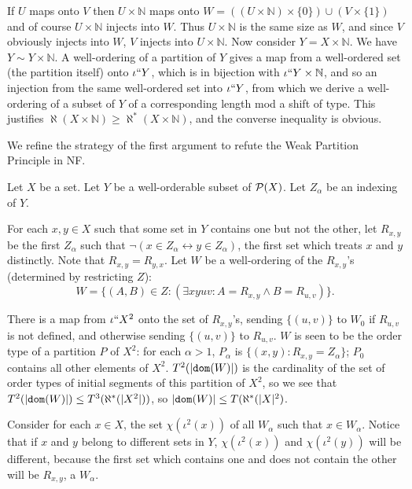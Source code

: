 \documentclass[12pt]{article}
\begin{document}
If $U$ maps onto $V$ then $U \times \mathbb N$ maps onto $W=((U \times \mathbb N) \times \{0\}) \cup (V \times \{1\})$ and of course $U \times \mathbb N$ injects into $W$.  Thus $U \times \mathbb N$ is
the same size as $W$, and since $V$ obviously injects into $W$, $V$ injects into $U \times \mathbb N$.  Now consider $Y = X \times \mathbb N$.  We have $Y \sim Y \times \mathbb N$.  A well-ordering of a partition of $Y$ gives a map from a well-ordered set (the partition itself) onto $\iota``Y$, which is in bijection with $\iota``Y \times \mathbb N$, and so an injection from the same well-ordered set into $\iota``Y$, from which we derive a well-ordering of a subset of $Y$ of a corresponding length mod a shift of type.  This justifies $\aleph(X \times \mathbb N)\geq \aleph^*(X \times \mathbb N)$, and the converse inequality is obvious.

We refine the strategy of the first argument to refute the Weak Partition Principle in NF.

Let $X$ be a set.  Let $Y$ be a well-orderable subset of ${\cal P}(X)$.  Let $Z_\alpha$ be an indexing of $Y$. 

For each $x,y \in X$ such that some set in $Y$ contains one but not the other, let $R_{x,y}$ be the first $Z_\alpha$ such that $\neg(x \in Z_\alpha \leftrightarrow y \in Z_\alpha)$, the first set which treats $x$ and $y$ distinctly.  Note that $R_{x,y}=R_{y,x}$.  Let $W$ be a well-ordering of the $R_{x,y}$'s (determined by restricting $Z$):  $$W = \{(A,B) \in Z:(\exists xyuv:A=R_{x,y} \wedge B=R_{u,v})\}.$$

There is a map from $\iota``X^2$ onto the set of $R_{x,y}$'s, sending $\{(u,v)\}$ to $W_0$ if $R_{u,v}$ is not defined, and otherwise sending $\{(u,v)\}$ to $R_{u,v}$.  $W$ is seen to be the order type of a partition $P$ of $X^2$:  for each $\alpha>1$, $P_\alpha$ is $\{(x,y):R_{x,y} = Z_\alpha\}$; $P_0$ contains all other elements of $X^2$.   $T^2(|{\tt dom}(W)|)$ is the cardinality of the set
of order types of initial segments of this partition of $X^2$, so we see that $T^2(|{\tt dom}(W)|)\leq T^3(\aleph^*(|X^2|))$, so $|{\tt dom}(W)| \leq T(\aleph^*(|X|^2)$.

Consider for
each $x \in X$, the set $\chi(\iota^2(x))$ of all $W_\alpha$ such that $x \in W_\alpha$.  Notice that if $x$ and $y$ belong to different
sets in $Y$, $\chi(\iota^2(x))$ and $\chi(\iota^2(y))$ will be different, because the first set which contains one and does not contain the other
will be $R_{x,y}$, a $W_\alpha$.   
\end{document}
